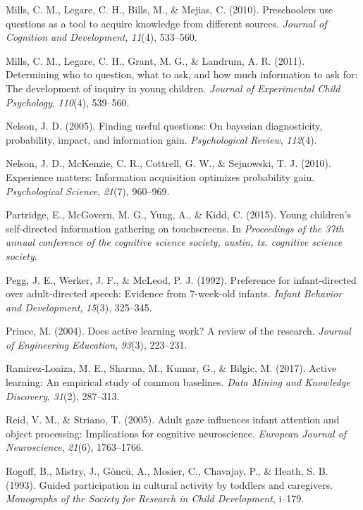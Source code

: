 \documentclass[a4paper,man,apacite,floatsintext]{apa6}
\begin{document}
\hypertarget{ref-mills2010preschoolers}{}
Mills, C. M., Legare, C. H., Bills, M., \& Mejias, C. (2010).
Preschoolers use questions as a tool to acquire knowledge from different
sources. \emph{Journal of Cognition and Development}, \emph{11}(4),
533--560.

\hypertarget{ref-mills2011determining}{}
Mills, C. M., Legare, C. H., Grant, M. G., \& Landrum, A. R. (2011).
Determining who to question, what to ask, and how much information to
ask for: The development of inquiry in young children. \emph{Journal of
Experimental Child Psychology}, \emph{110}(4), 539--560.

\hypertarget{ref-nelson2005finding}{}
Nelson, J. D. (2005). Finding useful questions: On bayesian
diagnosticity, probability, impact, and information gain.
\emph{Psychological Review}, \emph{112}(4).

\hypertarget{ref-nelson2010experience}{}
Nelson, J. D., McKenzie, C. R., Cottrell, G. W., \& Sejnowski, T. J.
(2010). Experience matters: Information acquisition optimizes
probability gain. \emph{Psychological Science}, \emph{21}(7), 960--969.

\hypertarget{ref-partridge2015young}{}
Partridge, E., McGovern, M. G., Yung, A., \& Kidd, C. (2015). Young
children's self-directed information gathering on touchscreens. In
\emph{Proceedings of the 37th annual conference of the cognitive science
society, austin, tx. cognitive science society}.

\hypertarget{ref-pegg1992preference}{}
Pegg, J. E., Werker, J. F., \& McLeod, P. J. (1992). Preference for
infant-directed over adult-directed speech: Evidence from 7-week-old
infants. \emph{Infant Behavior and Development}, \emph{15}(3), 325--345.

\hypertarget{ref-prince2004does}{}
Prince, M. (2004). Does active learning work? A review of the research.
\emph{Journal of Engineering Education}, \emph{93}(3), 223--231.

\hypertarget{ref-ramirez2017active}{}
Ramirez-Loaiza, M. E., Sharma, M., Kumar, G., \& Bilgic, M. (2017).
Active learning: An empirical study of common baselines. \emph{Data
Mining and Knowledge Discovery}, \emph{31}(2), 287--313.

\hypertarget{ref-reid2005adult}{}
Reid, V. M., \& Striano, T. (2005). Adult gaze influences infant
attention and object processing: Implications for cognitive
neuroscience. \emph{European Journal of Neuroscience}, \emph{21}(6),
1763--1766.

\hypertarget{ref-rogoff1993guided}{}
Rogoff, B., Mistry, J., Göncü, A., Mosier, C., Chavajay, P., \& Heath,
S. B. (1993). Guided participation in cultural activity by toddlers and
caregivers. \emph{Monographs of the Society for Research in Child
Development}, i--179.
\end{document}

